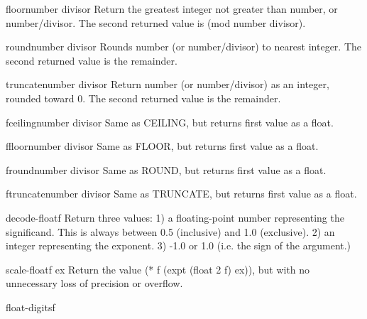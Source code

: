 \documentclass[10pt,english]{book}
\begin{document}
\begin{function}{floor}{number \op divisor}
  Return the greatest integer not greater than number, or number/divisor.
  The second returned value is (mod number divisor).
\end{function}

\begin{function}{round}{number \op divisor}
  Rounds number (or number/divisor) to nearest integer.
  The second returned value is the remainder.
\end{function}

\begin{function}{truncate}{number \op divisor}
  Return number (or number/divisor) as an integer, rounded toward 0.
  The second returned value is the remainder.
\end{function}

\begin{function}{fceiling}{number \op divisor}
  Same as CEILING, but returns first value as a float.
\end{function}

\begin{function}{ffloor}{number \op divisor}
  Same as FLOOR, but returns first value as a float.
\end{function}

\begin{function}{fround}{number \op divisor}
  Same as ROUND, but returns first value as a float.
\end{function}

\begin{function}{ftruncate}{number \op divisor}
  Same as TRUNCATE, but returns first value as a float.
\end{function}

\begin{function}{decode-float}{f}
  Return three values:
   1) a floating-point number representing the significand. This is always
      between 0.5 (inclusive) and 1.0 (exclusive).
   2) an integer representing the exponent.
   3) -1.0 or 1.0 (i.e. the sign of the argument.)
\end{function}

\begin{function}{scale-float}{f ex}
  Return the value (* f (expt (float 2 f) ex)), but with no unnecessary loss
  of precision or overflow.
\end{function}

\begin{function}{float-digits}{f}
  
\end{function}
\end{document}
